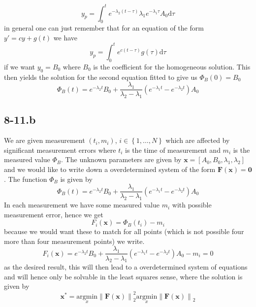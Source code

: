 \documentclass{article}
\begin{document}
\begin{equation*}
    y_{p} =  \int_{0}^{t}e^{-\lambda_{2}\left(t-\tau\right)}\lambda_{1}e^{-\lambda_{1}\tau}A_{0}\mathrm{d}\tau
\end{equation*}
in general one can just remember that for an equation of the form $y' = cy + g\left(t\right)$ we have
\begin{equation*}
    y_{p} = \int_{0}^{t}e^{c\left(t-\tau\right)}g\left(\tau\right)\mathrm{d}\tau
\end{equation*}
if we want $y_{0} = B_{0}$ where $B_{0}$ is the coefficient for the homogeneous solution. This then yields the solution for the second equation fitted to give us $\Phi_{B}\left(0\right) = B_{0}$
\begin{equation*}
    \Phi_{B}\left(t\right) = e^{-\lambda_{2}t}B_{0} + \frac{\lambda_{1}}{\lambda_{2}-\lambda_{1}}\left(e^{-\lambda_{1}t} - e^{-\lambda_{2}t}\right)A_{0}
\end{equation*}
\subsection*{8-11.b}
We are given measurement $\left(t_{i},m_{i}\right)$, $i \in \left\{1, \dots, N\right\}$ which are affected by significant measurement errors where $t_{i}$ is the time of measurement and $m_{i}$ is the measured value $\Phi_{B}$. The unknown parameters are given by $\mathbf{x} = \left[A_{0}, B_{0}, \lambda_{1}, \lambda_{2}\right]$ and we would like to write down a overdetermined system of the form $\mathbf{F}\left(\mathbf{x}\right) = \mathbf{0}$. The function $\Phi_{B}$ is given by 
\begin{equation*}
    \Phi_{B}\left(t\right) = e^{-\lambda_{2}t}B_{0} + \frac{\lambda_{1}}{\lambda_{2}-\lambda_{1}}\left(e^{-\lambda_{1}t} - e^{-\lambda_{2}t}\right)A_{0}
\end{equation*}
In each measurement we have some measured value $m_{i}$ with possible measurement error, hence we get
\begin{equation*}
    F_{i}\left(\mathbf{x}\right) = \Phi_{B}\left(t_{i}\right) - m_{i}
\end{equation*}
because we would want these to match for all points (which is not possible four more than four measurement points) we write. 
\begin{equation*}
    F_{i}\left(\mathbf{x}\right) = e^{-\lambda_{2}t}B_{0} + \frac{\lambda_{1}}{\lambda_{2}-\lambda_{1}}\left(e^{-\lambda_{1}t} - e^{-\lambda_{2}t}\right)A_{0} - m_{i} = 0
\end{equation*}
as the desired result, this will then lead to a overdetermined system of equations and will hence only be solvable in the least squares sense, where the solution is given by
\begin{equation*}
    \mathbf{x}^{*} = \underset{x}{\text{argmin}}\left\lVert \mathbf{F}\left(\mathbf{x}\right)\right\rVert_{2}^{2} \underset{x}{\text{argmin}}\left\lVert \mathbf{F}\left(\mathbf{x}\right)\right\rVert_{2}
\end{equation*}
\end{document}
